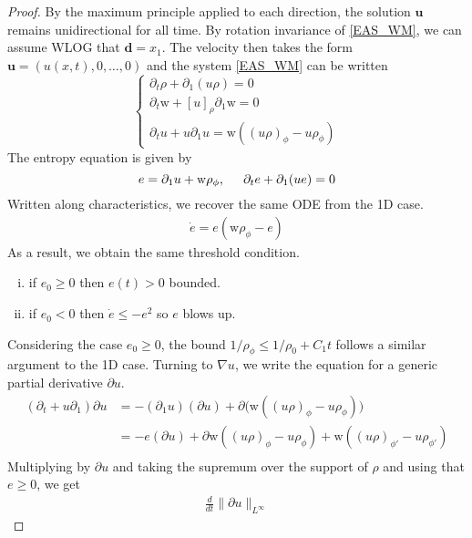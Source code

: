 \documentclass[11pt,letterpaper]{amsart}
\theoremstyle{plain}
\theoremstyle{definition}
\theoremstyle{remark}
\def \bd {{\bf d}}
\renewcommand{\geq}{\geqslant}
\renewcommand{\leq}{\leqslant}
\def\u{\textbf{u}}
\def\bd{\textbf{d}}
\def \wt {\mathrm{w}}
\begin{document}
\begin{proof}
    By the maximum principle applied to each direction, the solution $\u$ remains unidirectional for all time.
    By rotation invariance of \eqref{EAS_WM}, we can assume WLOG that $\bd = x_1$. 
    The velocity then takes the form $\u = (u(x,t), 0, \dots, 0)$ and the system \eqref{EAS_WM} can be written 
    \begin{equation*}
        \label{SM_uni}
        \begin{cases}
            \partial_t \rho + \partial_1 (u\rho) = 0 \\
            \partial_t \wt + [u]_{\rho} \partial_1 \wt = 0\\
            \partial_t u + u \partial_1 u = \wt ((u\rho)_{\phi} - u\rho_{\phi})
        \end{cases}
    \end{equation*}
    The entropy equation is given by
    $$
        e = \partial_1 u + \wt \rho_{\phi}, \hspace{5mm} \partial_t e + \partial_1(ue) = 0 
    $$
    Written along characteristics, we recover the same ODE from the 1D case.  
    \begin{align*}
        \dot{e} = e(\wt \rho_{\phi}-e)
    \end{align*}
    As a result, we obtain the same threshold condition. 
    \begin{enumerate}[(i)]
        \item if $e_0 \geq 0$ then $e(t) > 0$ bounded. 
        \item if $e_0 < 0$ then $\dot{e} \leq -e^2$ so $e$ blows up. 
    \end{enumerate}
    Considering the case $e_0 \geq 0$, the bound $1/\rho_{\phi} \leq 1/\rho_0 + C_1 t$ follows a similar argument to the 1D case. 
    Turning to $\nabla u$, we write the equation for a generic partial derivative $\partial u$. 
    \begin{align*}
        (\partial_t + u \partial_1) \partial u 
            &= -(\partial_1 u)(\partial u) + \partial \big( \wt((u\rho)_{\phi} - u \rho_{\phi}) \big) \\
            &= -e (\partial u) + \partial \wt ((u\rho)_{\phi} - u \rho_{\phi}) + \wt ((u\rho)_{\phi'} - u \rho_{\phi'}) \\
    \end{align*}
    Multiplying by $\partial u$ and taking the supremum over the support of $\rho$ and using that $e \geq 0$, 
    we get  
    \begin{align*}
        \frac{d}{dt} \|\partial u\|_{L^{\infty}}  

\end{align*}
\end{proof}
\end{document}
